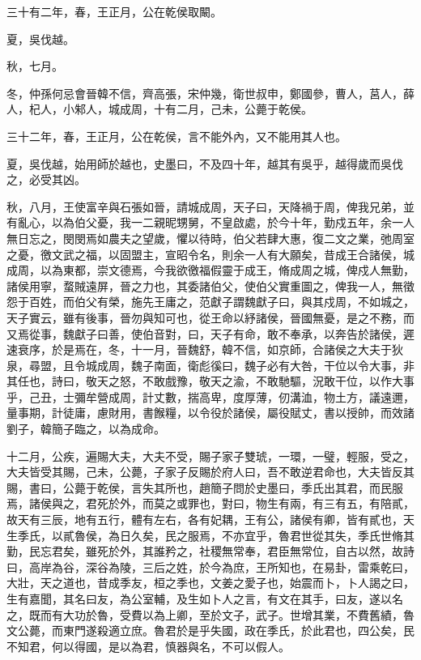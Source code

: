 \begin{pinyinscope}
三十有二年，春，王正月，公在乾侯取闞。

夏，吳伐越。

秋，七月。

冬，仲孫何忌會晉韓不信，齊高張，宋仲幾，衛世叔申，鄭國參，曹人，莒人，薛人，杞人，小邾人，城成周，十有二月，己未，公薨于乾侯。

三十二年，春，王正月，公在乾侯，言不能外內，又不能用其人也。

夏，吳伐越，始用師於越也，史墨曰，不及四十年，越其有吳乎，越得歲而吳伐之，必受其凶。

秋，八月，王使富辛與石張如晉，請城成周，天子曰，天降禍于周，俾我兄弟，並有亂心，以為伯父憂，我一二親昵甥舅，不皇啟處，於今十年，勤戍五年，余一人無日忘之，閔閔焉如農夫之望歲，懼以待時，伯父若肆大惠，復二文之業，弛周室之憂，徼文武之福，以固盟主，宣昭令名，則余一人有大願矣，昔成王合諸侯，城成周，以為東都，崇文德焉，今我欲徼福假靈于成王，脩成周之城，俾戍人無勤，諸侯用寧，蝥賊遠屏，晉之力也，其委諸伯父，使伯父實重圖之，俾我一人，無徵怨于百姓，而伯父有榮，施先王庸之，范獻子謂魏獻子曰，與其戍周，不如城之，天子實云，雖有後事，晉勿與知可也，從王命以紓諸侯，晉國無憂，是之不務，而又焉從事，魏獻子曰善，使伯音對，曰，天子有命，敢不奉承，以奔告於諸侯，遲速衰序，於是焉在，冬，十一月，晉魏舒，韓不信，如京師，合諸侯之大夫于狄泉，尋盟，且令城成周，魏子南面，衛彪徯曰，魏子必有大咎，干位以令大事，非其任也，詩曰，敬天之怒，不敢戲豫，敬天之渝，不敢馳驅，況敢干位，以作大事乎，己丑，士彌牟營成周，計丈數，揣高卑，度厚薄，仞溝洫，物土方，議遠邇，量事期，計徒庸，慮財用，書餱糧，以令役於諸侯，屬役賦丈，書以授帥，而效諸劉子，韓簡子臨之，以為成命。

十二月，公疾，遍賜大夫，大夫不受，賜子家子雙琥，一環，一璧，輕服，受之，大夫皆受其賜，己未，公薨，子家子反賜於府人曰，吾不敢逆君命也，大夫皆反其賜，書曰，公薨于乾侯，言失其所也，趙簡子問於史墨曰，季氏出其君，而民服焉，諸侯與之，君死於外，而莫之或罪也，對曰，物生有兩，有三有五，有陪貳，故天有三辰，地有五行，體有左右，各有妃耦，王有公，諸侯有卿，皆有貳也，天生季氏，以貳魯侯，為日久矣，民之服焉，不亦宜乎，魯君世從其失，季氏世脩其勤，民忘君矣，雖死於外，其誰矜之，社稷無常奉，君臣無常位，自古以然，故詩曰，高岸為谷，深谷為陵，三后之姓，於今為庶，王所知也，在易卦，雷乘乾曰，大壯，天之道也，昔成季友，桓之季也，文姜之愛子也，始震而卜，卜人謁之曰，生有嘉聞，其名曰友，為公室輔，及生如卜人之言，有文在其手，曰友，遂以名之，既而有大功於魯，受費以為上卿，至於文子，武子。世增其業，不費舊績，魯文公薨，而東門遂殺適立庶。魯君於是乎失國，政在季氏，於此君也，四公矣，民不知君，何以得國，是以為君，慎器與名，不可以假人。


\end{pinyinscope}